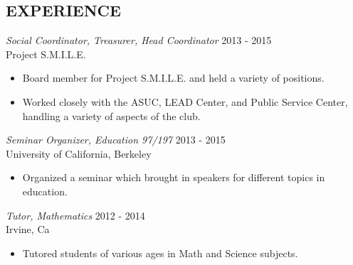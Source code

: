 \documentclass[margin]{res}
\begin{document}
\begin{resume}
\section{EXPERIENCE} {\sl Social Coordinator, Treasurer, Head Coordinator} \hfill            2013 - 2015\\
                Project S.M.I.L.E.
                 \begin{itemize}  \itemsep -2pt %
                 \item Board member for Project S.M.I.L.E. and
                                held a variety of positions.
                \item Worked closely with the ASUC, LEAD Center, and Public Service Center, handling a variety of aspects of the club.
                 \end{itemize}
                {\sl Seminar Organizer, Education 97/197} \hfill                       2013 - 2015\\
                University of California, Berkeley
                \begin{itemize} \itemsep -2pt
                \item Organized a seminar which brought in speakers for different topics in education.
                \end{itemize}
		{\sl Tutor, Mathematics} \hfill 2012 - 2014\\
		Irvine, Ca
		\begin{itemize} \itemsep -2pt
		\item Tutored students of various ages in Math and Science subjects.
		\end{itemize}

\end{resume}
\end{document}
